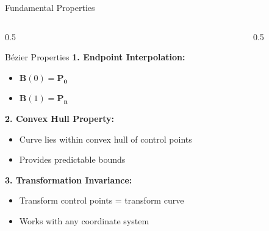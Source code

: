 \begin{frame}{Fundamental Properties}
  \begin{columns}
    \begin{column}{0.5\textwidth}
      \begin{conceptbox}{Bézier Properties}
        \footnotesize
        \textbf{1. Endpoint Interpolation:}
        \begin{itemize}
          \item $\mathbf{B}(0) = \mathbf{P_0}$
          \item $\mathbf{B}(1) = \mathbf{P_n}$
        \end{itemize}

        \textbf{2. Convex Hull Property:}
        \begin{itemize}
          \item Curve lies within convex hull of control points
          \item Provides predictable bounds
        \end{itemize}

        \textbf{3. Transformation Invariance:}
        \begin{itemize}
          \item Transform control points = transform curve
          \item Works with any coordinate system
        \end{itemize}
      \end{conceptbox}
    \end{column}
    \begin{column}{0.5\textwidth}
      \begin{center}
\end{center}
\end{column}
\end{columns}
\end{frame}
